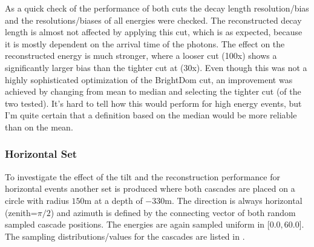 As a quick check of the performance of both cuts the decay length resolution/bias and the resolutions/biases of all energies were checked. The reconstructed decay length is almost not affected by applying this cut, which is as expected, because it is mostly dependent on the arrival time of the photons. The effect on the reconstructed energy is much stronger, where a looser cut (100x) shows a significantly larger bias than the tighter cut at (30x). Even though this was not a highly sophisticated optimization of the BrightDom cut, an improvement was achieved by changing from mean to median and selecting the tighter cut (of the two tested). It's hard to tell how this would perform for high energy events, but I'm quite certain that a definition based on the median would be more reliable than on the mean.



\subsubsection{Horizontal Set}

To investigate the effect of the tilt and the reconstruction performance for horizontal events another set is produced where both cascades are placed on a circle with radius $150$\si{\metre} at a depth of $-330$\si{\metre}. The direction is always horizontal (zenith=$\pi/2$) and azimuth is defined by the connecting vector of both random sampled cascade positions. The energies are again sampled uniform in [$0.0, 60.0$]\si{\gev}. The sampling distributions/values for the cascades are listed in . 



